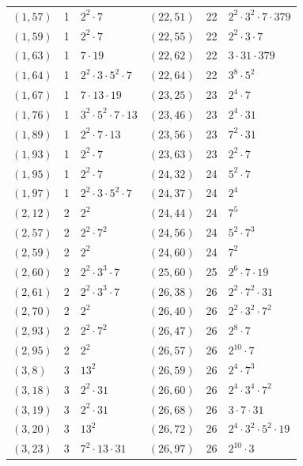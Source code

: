 \documentclass[11pt]{article}
\begin{document}
\begin{longtable}{@{}lrl@{\qquad}lrl@{}}
$(1,57)$ & 1 & $2^{2}\cdot 7$ & $(22,51)$ & 22 & $2^{2}\cdot 3^{2}\cdot 7\cdot 379$\\
$(1,59)$ & 1 & $2^{2}\cdot 7$ & $(22,55)$ & 22 & $2^{2}\cdot 3\cdot 7$\\
$(1,63)$ & 1 & $7\cdot 19$ & $(22,62)$ & 22 & $3\cdot 31\cdot 379$\\
$(1,64)$ & 1 & $2^{2}\cdot 3\cdot 5^{2}\cdot 7$ & $(22,64)$ & 22 & $3^{8}\cdot 5^{2}$\\
$(1,67)$ & 1 & $7\cdot 13\cdot 19$ & $(23,25)$ & 23 & $2^{4}\cdot 7$\\
$(1,76)$ & 1 & $3^{2}\cdot 5^{2}\cdot 7\cdot 13$ & $(23,46)$ & 23 & $2^{4}\cdot 31$\\
$(1,89)$ & 1 & $2^{2}\cdot 7\cdot 13$ & $(23,56)$ & 23 & $7^{2}\cdot 31$\\
$(1,93)$ & 1 & $2^{2}\cdot 7$ & $(23,63)$ & 23 & $2^{2}\cdot 7$\\
$(1,95)$ & 1 & $2^{2}\cdot 7$ & $(24,32)$ & 24 & $5^{2}\cdot 7$\\
$(1,97)$ & 1 & $2^{2}\cdot 3\cdot 5^{2}\cdot 7$ & $(24,37)$ & 24 & $2^{4}$\\
$(2,12)$ & 2 & $2^{2}$ & $(24,44)$ & 24 & $7^{5}$\\
$(2,57)$ & 2 & $2^{2}\cdot 7^{2}$ & $(24,56)$ & 24 & $5^{2}\cdot 7^{3}$\\
$(2,59)$ & 2 & $2^{2}$ & $(24,60)$ & 24 & $7^{2}$\\
$(2,60)$ & 2 & $2^{2}\cdot 3^{3}\cdot 7$ & $(25,60)$ & 25 & $2^{6}\cdot 7\cdot 19$\\
$(2,61)$ & 2 & $2^{2}\cdot 3^{3}\cdot 7$ & $(26,38)$ & 26 & $2^{2}\cdot 7^{2}\cdot 31$\\
$(2,70)$ & 2 & $2^{2}$ & $(26,40)$ & 26 & $2^{2}\cdot 3^{2}\cdot 7^{2}$\\
$(2,93)$ & 2 & $2^{2}\cdot 7^{2}$ & $(26,47)$ & 26 & $2^{8}\cdot 7$\\
$(2,95)$ & 2 & $2^{2}$ & $(26,57)$ & 26 & $2^{10}\cdot 7$\\
$(3,8)$ & 3 & $13^{2}$ & $(26,59)$ & 26 & $2^{4}\cdot 7^{3}$\\
$(3,18)$ & 3 & $2^{2}\cdot 31$ & $(26,60)$ & 26 & $2^{4}\cdot 3^{4}\cdot 7^{2}$\\
$(3,19)$ & 3 & $2^{2}\cdot 31$ & $(26,68)$ & 26 & $3\cdot 7\cdot 31$\\
$(3,20)$ & 3 & $13^{2}$ & $(26,72)$ & 26 & $2^{4}\cdot 3^{2}\cdot 5^{2}\cdot 19$\\
$(3,23)$ & 3 & $7^{2}\cdot 13\cdot 31$ & $(26,97)$ & 26 & $2^{10}\cdot 3$\\

\end{longtable}
\end{document}
